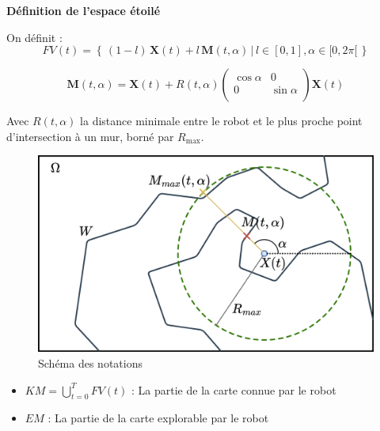 \documentclass[aspectratio=169,10pt]{beamer}
\begin{document}
\begin{frame}[t]{\textbf{Définition de l'espace étoilé}}
	\begin{minipage}[t]{0.6\linewidth}
		On définit :
		\begin{equation*}
			\displaystyle
			FV(t) = \left\{ \, (1 - l) \, \mathbf{X}(t) + l\, \mathbf{M}(t, \alpha) \,|\, l \in [0, 1], \alpha \in [0, 2 \pi[ \, \right\}
		\end{equation*}
			
		\begin{equation*}
			\mathbf{M}(t, \alpha) = \mathbf{X}(t) + R(t, \alpha) 
			\begin{pmatrix}
				\cos \alpha & 0\\
				0 & \sin \alpha\\
			\end{pmatrix} 
			\mathbf{X}(t)
		\end{equation*}
	
		Avec $R(t, \alpha)$ la distance minimale entre le robot et le plus proche point d'intersection à un mur, borné par $R_{\max}$.
	\end{minipage}
	\hfill
	\begin{minipage}[t]{0.38\linewidth}
		\begin{figure}
			\centering
			\includegraphics[width=\textwidth]{IMAGES/math_nota.png}
			\caption{Schéma des notations}
			\label{fig:math_notation}
		\end{figure}
	\end{minipage}
	
	\begin{itemize}
		\item $\displaystyle KM = \bigcup_{t=0}^{T} FV(t)$ : La partie de la carte connue par le robot
		\item $EM$ : La partie de la carte explorable par le robot
	\end{itemize}

\end{frame}
\end{document}
